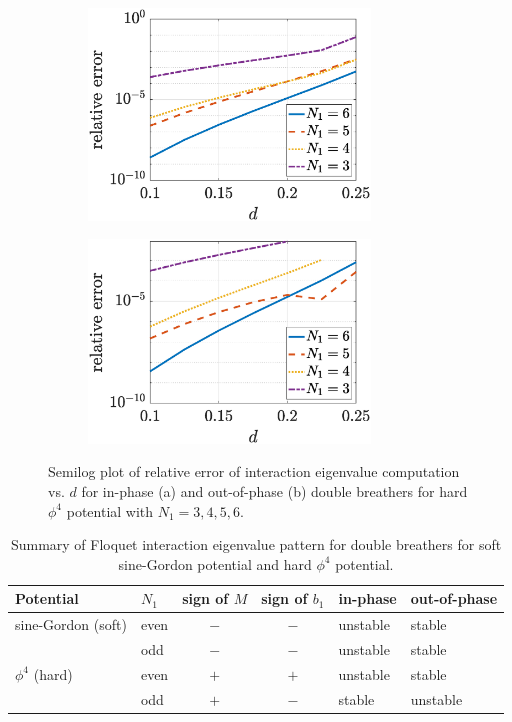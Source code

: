 \documentclass[12pt,reqno]{amsart}
\theoremstyle{definition}
\begin{document}
\begin{figure}
	\begin{center}
		\begin{subfigure}{0.45\linewidth}
		\caption{}
		\includegraphics[width=7.5cm]{images/doublephi4eigerrorpp.eps} 
		\label{fig:phi4eigerrora} 
	\end{subfigure}
	\begin{subfigure}{0.45\linewidth}
		\caption{}
		\includegraphics[width=7.5cm]{images/doublephi4eigerrorpm.eps} 
		\label{fig:phi4eigerrorb} 
	\end{subfigure}
	\end{center}
	\caption{Semilog plot of relative error of interaction eigenvalue computation vs. $d$ for in-phase (a) and out-of-phase (b) double breathers for hard $\phi^4$ potential with $N_1 = 3, 4, 5, 6$.}
	\label{fig:phi4eigerror}
\end{figure}

\begin{table}
\begin{tabular}{llccll}\toprule
Potential & $N_1$ & sign of $M$ & sign of $b_1$ & in-phase & out-of-phase \\ \midrule
sine-Gordon (soft) & even & $-$ & $-$ & unstable & stable \\ 
                   & odd  & $-$ & $-$ & unstable & stable \\
$\phi^4$ (hard)    & even & $+$ & $+$ & unstable & stable \\
                   & odd  & $+$ & $-$ & stable & unstable \\ \bottomrule
\end{tabular}
\caption{Summary of Floquet interaction eigenvalue pattern for double breathers for soft sine-Gordon potential and hard $\phi^4$ potential.}
\label{table:spec}
\end{table}
\end{document}
